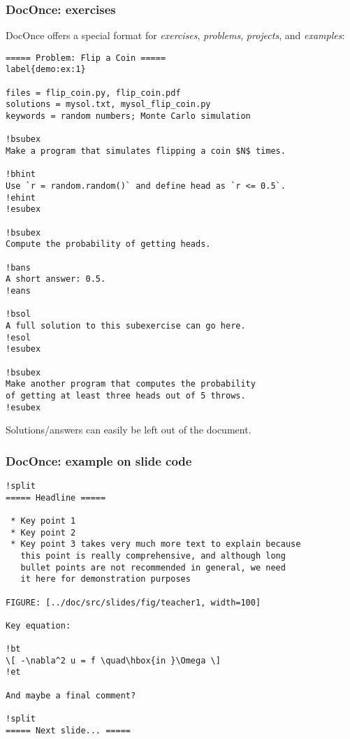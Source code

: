 \documentclass{beamer}
\begin{document}
\begin{frame}
\frametitle{DocOnce: exercises}

DocOnce offers a special format for \emph{exercises}, \emph{problems}, \emph{projects},
and \emph{examples}:
\begin{Verbatim}[numbers=none,fontsize=\fontsize{9pt}{9pt},baselinestretch=0.95]
===== Problem: Flip a Coin =====
label{demo:ex:1}

files = flip_coin.py, flip_coin.pdf
solutions = mysol.txt, mysol_flip_coin.py
keywords = random numbers; Monte Carlo simulation

!bsubex
Make a program that simulates flipping a coin $N$ times.

!bhint
Use `r = random.random()` and define head as `r <= 0.5`.
!ehint
!esubex

!bsubex
Compute the probability of getting heads.

!bans
A short answer: 0.5.
!eans

!bsol
A full solution to this subexercise can go here.
!esol
!esubex

!bsubex
Make another program that computes the probability
of getting at least three heads out of 5 throws.
!esubex

\end{Verbatim}

Solutions/answers can easily be left out of the document.
\end{frame}

\begin{frame}
\frametitle{DocOnce: example on slide code}

\begin{Verbatim}[numbers=none,fontsize=\fontsize{9pt}{9pt},baselinestretch=0.95]
!split
===== Headline =====

 * Key point 1
 * Key point 2
 * Key point 3 takes very much more text to explain because
   this point is really comprehensive, and although long
   bullet points are not recommended in general, we need
   it here for demonstration purposes

FIGURE: [../doc/src/slides/fig/teacher1, width=100]

Key equation:

!bt
\[ -\nabla^2 u = f \quad\hbox{in }\Omega \]
!et

And maybe a final comment?

!split
===== Next slide... =====

\end{Verbatim}
\end{frame}
\end{document}
